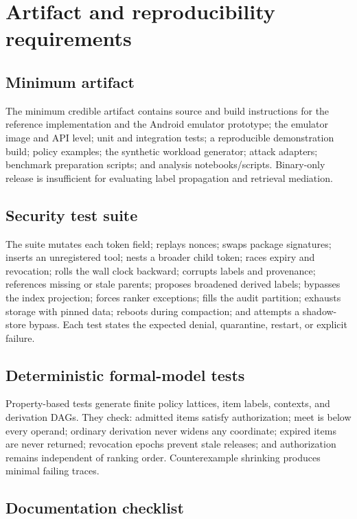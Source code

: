 \section{Artifact and reproducibility requirements}
\label{app:reproducibility}

\subsection{Minimum artifact}

The minimum credible artifact contains source and build instructions for the reference implementation and the Android emulator prototype; the emulator image and API level; unit and integration tests; a reproducible demonstration build; policy examples; the synthetic workload generator; attack adapters; benchmark preparation scripts; and analysis notebooks/scripts. Binary-only release is insufficient for evaluating label propagation and retrieval mediation.

\subsection{Security test suite}

The suite mutates each token field; replays nonces; swaps package signatures; inserts an unregistered tool; nests a broader child token; races expiry and revocation; rolls the wall clock backward; corrupts labels and provenance; references missing or stale parents; proposes broadened derived labels; bypasses the index projection; forces ranker exceptions; fills the audit partition; exhausts storage with pinned data; reboots during compaction; and attempts a shadow-store bypass. Each test states the expected denial, quarantine, restart, or explicit failure.

\subsection{Deterministic formal-model tests}

Property-based tests generate finite policy lattices, item labels, contexts, and derivation DAGs. They check: admitted items satisfy authorization; meet is below every operand; ordinary derivation never widens any coordinate; expired items are never returned; revocation epochs prevent stale releases; and authorization remains independent of ranking order. Counterexample shrinking produces minimal failing traces.

\subsection{Documentation checklist}

